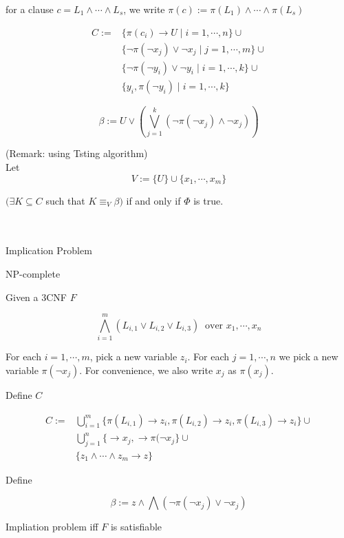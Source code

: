 \documentclass[12pt]{article}
\begin{document}
for a clause $c=L_1\wedge\cdots\wedge L_s$, we write 
$\pi(c):=\pi(L_1)\wedge\cdots\wedge \pi(L_s)$





$$\begin{array}{ll}C:=&\{\pi(c_i)\rightarrow U\mid i=1,\cdots,n\}\cup\\ 
&\{\neg \pi(\neg x_j)\vee \neg x_j\mid j=1,\cdots,m\}\cup\\

&\{\neg \pi(\neg y_i)\vee \neg y_i\mid i=1,\cdots, k\}\cup\\
&\{y_i,\pi(\neg y_i)\mid i=1,\cdots,k\}\end{array}$$


$$\beta:= U\vee \left(\bigvee_{j=1}^k (\neg \pi(\neg x_j)\wedge \neg x_j)\right)$$


(Remark: using Tsting algorithm) \\

Let $$V:=\{U\}\cup\{x_1,\cdots,x_m\}$$

$(\exists K\subseteq C$ such that $K\equiv_V \beta)$ if and only if $\Phi$ is true.

\ \\

\ \\

Implication Problem

NP-complete  

Given a 3CNF  $F$

$$\bigwedge_{i=1}^m (L_{i,1}\vee L_{i,2}\vee L_{i,3}) \ \mbox{ over } x_1,\cdots, x_n$$

For each $i=1,\cdots,m$, pick a new variable $z_i$. For each $j=1,\cdots, n$ we pick a new variable $\pi(\neg x_j)$. For convenience, we also write $x_j$ as $\pi(x_j)$. 

Define $C$ 

$$\begin{array}{ll}C:=&
\bigcup_{i=1}^m\{\pi(L_{i,1})\rightarrow z_i, \pi(L_{i,2})\rightarrow z_i, \pi(L_{i,3})\rightarrow z_i\}\cup\\ & \bigcup_{j=1}^n\{\rightarrow x_j, \rightarrow \pi(\neg x_j\} \cup\\ &
\{z_1\wedge\cdots\wedge z_m\rightarrow z\}\end{array}$$

Define 

$$\beta:=z\wedge\bigwedge (\neg \pi(\neg x_j)\vee \neg x_j)$$


Impliation problem iff $F$ is satisfiable \\
\end{document}
